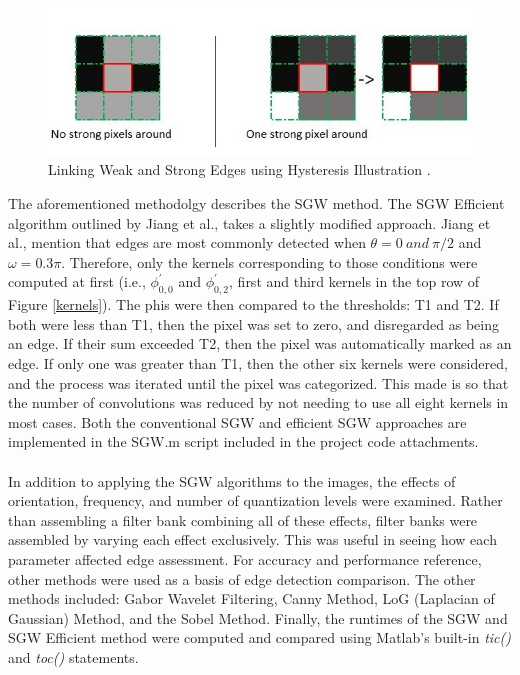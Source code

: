 \documentclass[./rarnold_final_project.tex]{subfiles}
\begin{document}
\clearpage

	\begin{figure}[!htbp]
	\centering
	\includegraphics[scale=0.55]{"hysteresis"}
	\captionsetup{justification=centering}
	\caption{Linking Weak and Strong Edges using Hysteresis Illustration \cite{website}.} 
	\label{hyst}
	\end{figure}

\noindent The aforementioned methodolgy describes the SGW method.  The SGW Efficient algorithm outlined by Jiang et al., takes a slightly modified approach.  Jiang et al., mention that edges are most commonly detected when $\theta = 0 \: and \: \pi/2$ and $\omega = 0.3\pi$.  Therefore, only the kernels corresponding to those conditions were computed at first (i.e., $\phi^{'}_{0,0}$ and $\phi^{'}_{0,2}$, first and third kernels in the top row of Figure \ref{kernels}).  The phis were then compared to the thresholds: T1 and T2.  If both were less than T1, then the pixel was set to zero, and disregarded as being an edge.  If their sum exceeded T2, then the pixel was automatically marked as an edge.  If only one was greater than T1, then the other six kernels were considered, and the process was iterated until the pixel was categorized.  This made is so that the number of convolutions was reduced by not needing to use all eight kernels in most cases.  Both the conventional SGW and efficient SGW approaches are implemented in the SGW.m script included in the project code attachments.  
\\ \\
\noindent In addition to applying the SGW algorithms to the images, the effects of orientation, frequency, and number of quantization levels were examined.  Rather than assembling a filter bank combining all of these effects, filter banks were assembled by varying each effect exclusively.  This was useful in seeing how each parameter affected edge assessment. For accuracy and performance reference, other methods were used as a basis of edge detection comparison.  The other methods included: Gabor Wavelet Filtering, Canny Method, LoG (Laplacian of Gaussian) Method, and the Sobel Method.  Finally, the runtimes of the SGW and SGW Efficient method were computed and compared using Matlab's built-in \textit{tic()} and \textit{toc()} statements.  
\end{document}
